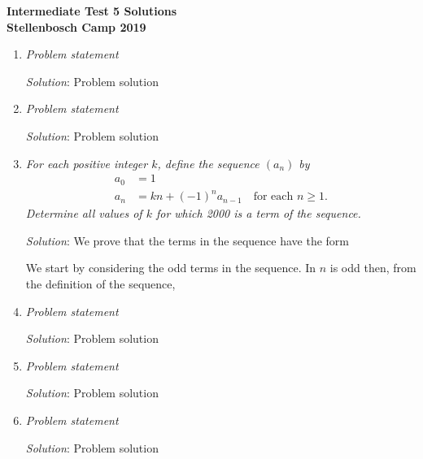 \documentclass{article}
\begin{document}
\begin{center}
  \textbf{\Large Intermediate Test 5 Solutions}
  \\ \vspace{1em}
  \textbf{\large Stellenbosch Camp 2019}
\end{center}


\begin{enumerate}[1.]

\item %
\textit{Problem statement}

\textit{Solution}: Problem solution

\item %
\textit{Problem statement}

\textit{Solution}: Problem solution

\item %
\textit{For each positive integer $k$, define the sequence $(a_{n})$ by
	\begin{align*}
	a_{0} &= 1 \\
	a_{n} &= kn + (-1)^{n}a_{n-1} \quad \text{for each } n \geq 1.
	\end{align*}
	Determine all values of $k$ for which 2000 is a term of the sequence.}

\textit{Solution}:
We prove that the terms in the sequence have the form

We start by considering the odd terms in the sequence. In $n$ is odd then, from the definition of the sequence, 

\item %
\textit{Problem statement}

\textit{Solution}: Problem solution

\item %
\textit{Problem statement}

\textit{Solution}: Problem solution

\item %
\textit{Problem statement}

\textit{Solution}: Problem solution

\end{enumerate}
\end{document}
